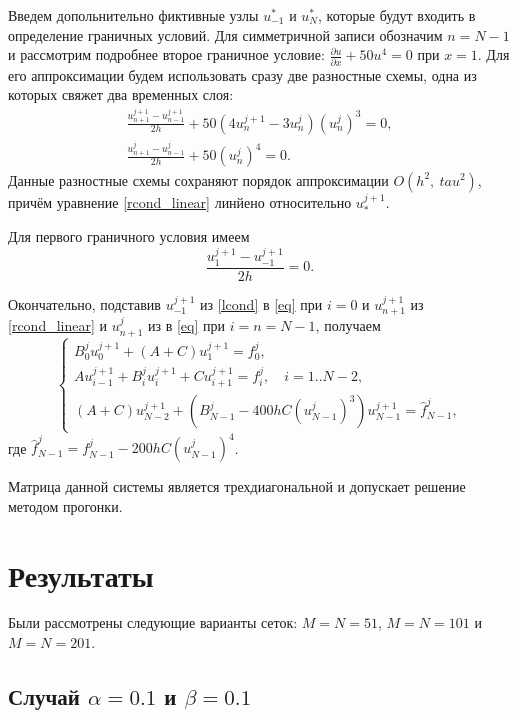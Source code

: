 \documentclass[a4paper,12pt]{article}
\begin{document}
Введем допольнительно фиктивные узлы \(u_{-1}^{*}\) и \(u_{N}^{*}\), которые будут входить в определение граничных условий. Для симметричной записи обозначим \(n=N-1\) и рассмотрим подробнее второе граничное условие: \(\frac{\partial u}{\partial x}+50u^4=0\) при \(x=1\). Для его аппроксимации будем использовать сразу две разностные схемы, одна из которых свяжет два временных слоя:
\begin{gather}
  \label{rcond_linear}\frac{u_{n+1}^{j+1}-u_{n-1}^{j+1}}{2h}+50\left(4u_{n}^{j+1}-3u_{n}^{j}\right)\left(u_{n}^{j}\right)^3=0,\\
  \label{rcond}\frac{u_{n+1}^{j}-u_{n-1}^{j}}{2h}+50 \left(u_{n}^{j}\right)^4 =0.
\end{gather}
Данные разностные схемы сохраняют порядок аппроксимации \(O(h^2,\
tau^2)\), причём уравнение \cref{rcond_linear} линйено относительно \(u_{*}^{j+1}\).

Для первого граничного условия имеем
\begin{equation}\label{lcond}
  \frac{u_{1}^{j+1}-u_{-1}^{j+1}}{2h}=0.
\end{equation}


Окончательно, подставив \(u_{-1}^{j+1}\) из \cref{lcond} в \cref{eq} при \(i=0\) и \(u_{n+1}^{j+1}\) из \cref{rcond_linear} и \(u_{n+1}^{j}\) из \label{rcond} в \cref{eq} при \(i=n=N-1\), получаем
\begin{equation*}
  \begin{cases}
    B_{0}^{j} u_{0}^{j+1} + \left(A + C\right) u_{1}^{j+1} = f_{0}^{j},                     \\
    A u_{i-1}^{j+1} + B_{i}^{j} u_{i}^{j+1} + C u_{i+1}^{j+1} =  f_{i}^{j}, \quad i=1..N-2, \\
    \left(A + C\right) u_{N-2}^{j+1} + \left(B_{N-1}^{j} - 400 h C \left(u_{N-1}^{j}\right)^3 \right) u_{N-1}^{j+1} = \hat{f}_{N-1}^{j},
  \end{cases}
\end{equation*}
где \(\hat{f}_{N-1}^{j}=f_{N-1}^{j}-200 h C \left(u_{N-1}^{j}\right)^4\).

Матрица данной системы является трехдиагональной и допускает решение методом прогонки.

\section*{Результаты}
Были рассмотрены следующие варианты сеток: \(M=N=51\), \(M=N=101\) и \(M=N=201\).

\subsection*{Случай \(\alpha=0.1\) и \(\beta=0.1\)}
\end{document}
